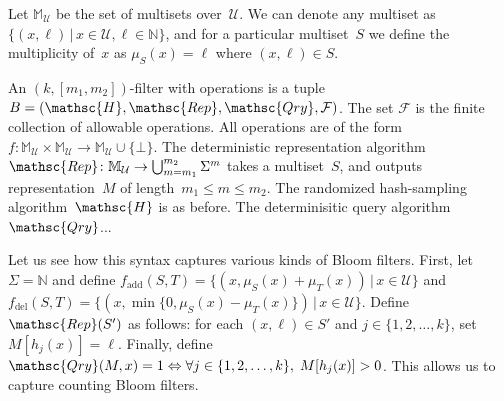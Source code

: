 

Let $\mathbb{M}_\mathcal{U}$ be the set of multisets over~$\mathcal{U}$.  We can denote any multiset as $\{(x,\ell) \,|\, x \in \mathcal{U}, \ell \in \mathbb{N}\}$, and for a particular multiset~$S$ we define the multiplicity of~$x$ as $\mu_S(x) = \ell$ where $(x,\ell)\in S$.

An $(k,[m_1,m_2])$-filter with operations is a tuple  $B=(\mathsc{H},\mathsc{Rep},\mathsc{Qry}, \mathcal{F})$.  
The set $\mathcal{F}$ is the finite collection of allowable operations.  All operations are of the form 
$f: \mathbb{M}_{\mathcal{U}} \times \mathbb{M}_{\mathcal{U}} \rightarrow \mathbb{M}_{\mathcal{U}} \cup \{\bot\}$.  
%
The deterministic representation algorithm $\mathsc{Rep}\colon \mathbb{M}_\mathcal{U} \rightarrow \bigcup_{m=m_1}^{m_2}\Sigma^m$ takes a multiset~$S$, and outputs representation~$M$ of length~$m_1 \leq m \leq m_2$.   
%
The randomized hash-sampling algorithm~$\mathsc{H}$ is as before.
%
The determinisitic query algorithm $\mathsc{Qry}$... 


Let us see how this syntax captures various kinds of Bloom filters.  First, let $\Sigma = \mathbb{N}$ and define $f_{\mathrm{add}}(S,T)=\{(x,\mu_S(x)+\mu_T(x)) \,|\, x \in \mathcal{U}\}$ and $f_\mathrm{del}(S,T) = \{(x,\min\{0,\mu_S(x)-\mu_T(x)\}) \,|\, x \in \mathcal{U} \}$.  Define $\mathsc{Rep}(S')$ as follows: for each $(x,\ell)\in S'$ and $j\in\{1,2,\ldots,k\}$, set $M[h_j(x)]=\ell$.   Finally, define $\mathsc{Qry}(M,x) = 1 \Leftrightarrow \forall j \in \{1,2,\ldots,k\},\; M[h_j(x)] > 0$.  This allows us to capture counting Bloom filters. 

